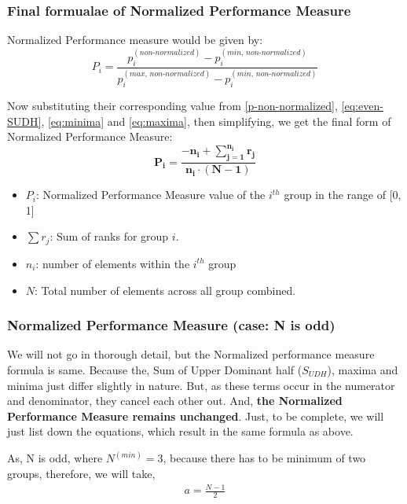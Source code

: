 \documentclass[a4paper,fleqn,review]{cas-sc}
\begin{document}
\subsubsection{Final formualae of Normalized Performance Measure}
Normalized Performance measure would be given by:
\begin{equation}
	P_i = \frac{p_i^{(non\text{-}normalized)} - p_i^{(min, \, non\text{-}normalized)}}{p_i^{(max, \, non\text{-}normalized)} - p_i^{(min, \, non\text{-}normalized)}}
	\label{eq:normalized-simpler}
\end{equation}

Now substituting their corresponding value from \autoref{p-non-normalized},  
 \autoref{eq:even-SUDH}, \autoref{eq:minima} and \autoref{eq:maxima}, then simplifying, we get the final form of Normalized Performance Measure:
\begin{equation}
	\boxed{
		\mathbf{
			P_i = \frac{-n_i +  \sum\limits_{j=1}^{n_i} r_j}{n_i \cdot (N - 1)}}
	}
\end{equation}
\begin{itemize}
	\item \textbf{$P_i$}: Normalized Performance Measure value of the $i^{th}$ group in the range of [0, 1]
	\item \textbf{$\sum r_j$}: Sum of ranks for group $i$.
	\item \textbf{$n_i$}: number of elements within the $i^{th}$ group
	\item \textbf{$N$}: Total number of elements across all group combined.
\end{itemize}

\subsubsection{Normalized Performance Measure (case: N is odd)}
We will not go in thorough detail, but the Normalized performance measure formula is same. Because the, Sum of Upper Dominant half ($S_{UDH}$), maxima and minima just differ slightly in nature. But, as these terms occur in the numerator and denominator, they cancel each other out. And, \textbf{the Normalized Performance Measure remains unchanged}. Just, to be complete, we will just list down the equations, which result in the same formula as above.

As, N is odd, where $N^{(min)} = 3$, because there has to be minimum of two groups, therefore, we will take,
\begin{align*}
	a = \frac{N-1}{2}
\end{align*}
\end{document}
